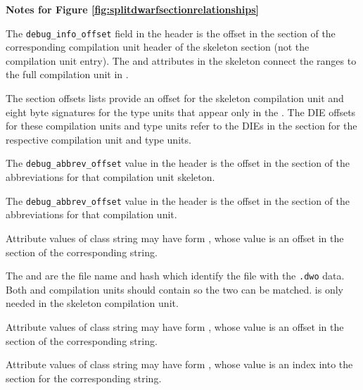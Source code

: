 \clearpage
\begin{center}
   \textbf{Notes for Figure \ref{fig:splitdwarfsectionrelationships}}
\end{center}
\begin{description}
The \texttt{debug\_info\_offset} field in the header is the 
offset in the \dotdebuginfo{} section of the corresponding 
compilation unit header of the skeleton \dotdebuginfo{} section 
(not the compilation unit entry).  The \DWATdwoid{} and 
\DWATdwoname{} attributes in the \dotdebuginfo{} skeleton 
connect the ranges to the full compilation unit in \dotdebuginfodwo.

The \dotdebugnames{} section  offsets lists provide an offset
for the skeleton compilation unit and eight 
byte signatures for the type units that appear only in the 
\dotdebuginfodwo. The DIE offsets for these 
compilation units and type units refer to the DIEs in the 
\dotdebuginfodwo{} section for the respective 
compilation unit and type units.

The \texttt{debug\_abbrev\_offset} value in the header is 
the offset in the \dotdebugabbrev{} section of the 
abbreviations for that compilation unit skeleton.

The \texttt{debug\_abbrev\_offset} value in the header 
is the offset in the \dotdebugabbrevdwo{} section of the 
abbreviations for that compilation unit.

Attribute values of class string may have form \DWFORMstrp, 
whose value is an offset in the 
\dotdebugstr{} section of the corresponding string.

The \DWATdwoname{} and \DWATdwoid{} are the file name 
and hash which identify the file with 
the \texttt{.dwo} data. Both \dotdebuginfo{} and 
\dotdebuginfodwo{} compilation units should contain 
\DWATdwoid{} so the two can be matched.  \DWATdwoname{} 
is only needed in the \dotdebuginfo{} 
skeleton compilation unit. 

Attribute values of class string may have form 
\DWFORMstrp, whose value is an offset in the 
\dotdebugstrdwo{} section of the corresponding string.

Attribute values of class string may have form 
\DWFORMstrx, whose value is an index into  the 
\dotdebugstroffsets{} section for the corresponding string.


\end{description}
